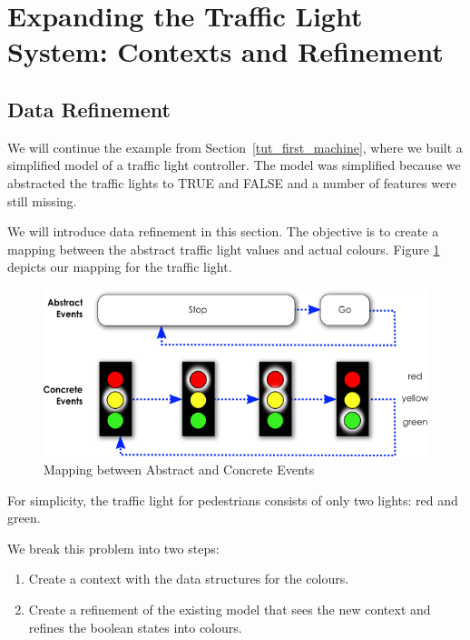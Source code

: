 \section{Expanding the Traffic Light System: Contexts and Refinement}
\label{tut_expanding_traffic_light_system}


\subsection{Data Refinement}
\label{tut_data_refinement}

We will continue the example from Section~\ref{tut_first_machine}, where we built a simplified model of a traffic light controller.  The model was simplified because we abstracted the traffic lights to TRUE and FALSE and a number of features were still missing.

We will introduce data refinement in this section.  The objective is to create a mapping between the abstract traffic light values and actual colours. Figure \ref{fig_tut_07_tl_colours} depicts our mapping for the traffic light.

\begin{figure}[!ht]
\begin{center}
	\includegraphics{img/tutorial/tl-colors.png}
	\caption{Mapping between Abstract and Concrete Events}
	\label{fig_tut_07_tl_colours}
\end{center}
\end{figure}

For simplicity, the traffic light for pedestrians consists of only two lights: red and green.

We break this problem into two steps:

\begin{enumerate}
	\item Create a context with the data structures for the colours.
	\item Create a refinement of the existing model that sees the new context and refines the boolean states into colours.
\end{enumerate}


